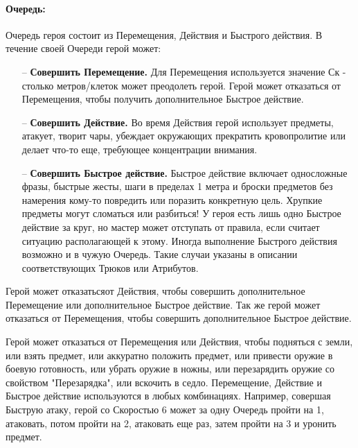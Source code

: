 \paragraph{Очередь:} Очередь героя состоит из Перемещения, Действия и Быстрого действия. В течение своей Очереди герой может:
\begin{itemize}
\item[--] \textbf{Совершить Перемещение.} Для Перемещения используется значение Ск - столько метров/клеток может преодолеть герой. Герой может отказаться от Перемещения, чтобы получить дополнительное Быстрое действие.
\item[--] \textbf{Совершить Действие.} Во время Действия герой использует предметы, атакует, творит чары, убеждает окружающих прекратить кровопролитие или делает что-то еще, требующее концентрации внимания.
\item[--] \textbf{Совершить Быстрое действие.} Быстрое действие включает односложные фразы, быстрые жесты, шаги в пределах 1 метра и броски предметов без намерения кому-то повредить или поразить конкретную цель. Хрупкие предметы могут сломаться или разбиться! У героя есть лишь одно Быстрое действие за круг, но мастер может отступать от правила, если считает ситуацию располагающей к этому. Иногда выполнение Быстрого действия возможно и в чужую Очередь. Такие случаи указаны в описании соответствующих Трюков или Атрибутов.
\end{itemize}
\begin{tcolorbox}
Герой может отказатьсяот Действия, чтобы совершить дополнительное Перемещение или дополнительное Быстрое действие.
\newline
Так же герой может отказаться от Перемещения, чтобы совершить дополнительное Быстрое действие.
\end{tcolorbox}
Герой может отказаться от Перемещения или Действия, чтобы подняться с земли, или взять предмет, или аккуратно положить предмет, или привести оружие в боевую готовность, или убрать оружие в ножны, или перезарядить оружие со свойством "Перезарядка", или вскочить в седло.
\newline
Перемещение, Действие и Быстрое действие используются в любых комбинациях. Например, совершая Быструю атаку, герой со Скоростью 6 может за одну Очередь пройти на 1, атаковать, потом пройти на 2, атаковать еще раз, затем пройти на 3 и уронить предмет.


